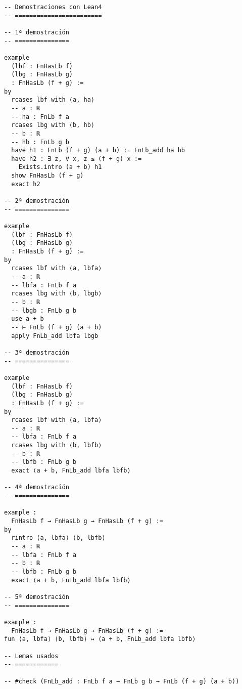 \begin{verbatim}
-- Demostraciones con Lean4
-- ========================

-- 1ª demostración
-- ===============

example
  (lbf : FnHasLb f)
  (lbg : FnHasLb g)
  : FnHasLb (f + g) :=
by
  rcases lbf with ⟨a, ha⟩
  -- a : ℝ
  -- ha : FnLb f a
  rcases lbg with ⟨b, hb⟩
  -- b : ℝ
  -- hb : FnLb g b
  have h1 : FnLb (f + g) (a + b) := FnLb_add ha hb
  have h2 : ∃ z, ∀ x, z ≤ (f + g) x :=
    Exists.intro (a + b) h1
  show FnHasLb (f + g)
  exact h2

-- 2ª demostración
-- ===============

example
  (lbf : FnHasLb f)
  (lbg : FnHasLb g)
  : FnHasLb (f + g) :=
by
  rcases lbf with ⟨a, lbfa⟩
  -- a : ℝ
  -- lbfa : FnLb f a
  rcases lbg with ⟨b, lbgb⟩
  -- b : ℝ
  -- lbgb : FnLb g b
  use a + b
  -- ⊢ FnLb (f + g) (a + b)
  apply FnLb_add lbfa lbgb

-- 3ª demostración
-- ===============

example
  (lbf : FnHasLb f)
  (lbg : FnHasLb g)
  : FnHasLb (f + g) :=
by
  rcases lbf with ⟨a, lbfa⟩
  -- a : ℝ
  -- lbfa : FnLb f a
  rcases lbg with ⟨b, lbfb⟩
  -- b : ℝ
  -- lbfb : FnLb g b
  exact ⟨a + b, FnLb_add lbfa lbfb⟩

-- 4ª demostración
-- ===============

example :
  FnHasLb f → FnHasLb g → FnHasLb (f + g) :=
by
  rintro ⟨a, lbfa⟩ ⟨b, lbfb⟩
  -- a : ℝ
  -- lbfa : FnLb f a
  -- b : ℝ
  -- lbfb : FnLb g b
  exact ⟨a + b, FnLb_add lbfa lbfb⟩

-- 5ª demostración
-- ===============

example :
  FnHasLb f → FnHasLb g → FnHasLb (f + g) :=
fun ⟨a, lbfa⟩ ⟨b, lbfb⟩ ↦ ⟨a + b, FnLb_add lbfa lbfb⟩

-- Lemas usados
-- ============

-- #check (FnLb_add : FnLb f a → FnLb g b → FnLb (f + g) (a + b))
\end{verbatim}

